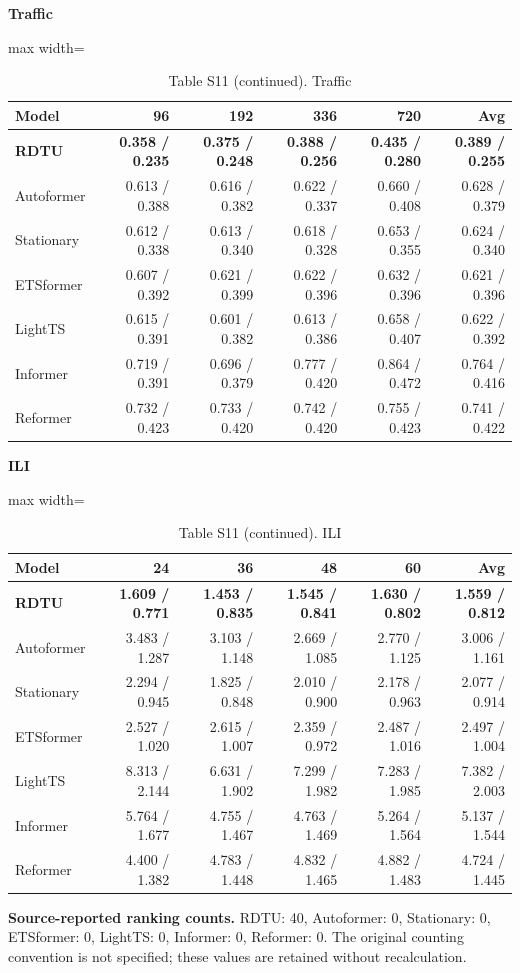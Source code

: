 \begin{table}[H]\centering\small
\caption*{Table S11 (continued). Traffic}
\textbf{Traffic}\par\smallskip
\begin{adjustbox}{max width=\linewidth}\begin{tabular}{lrrrrr}\toprule
\textbf{Model} & \textbf{96} & \textbf{192} & \textbf{336} & \textbf{720} & \textbf{Avg}\\\midrule
\rowcolor{blue!5}
\textbf{RDTU} & \textbf{0.358 / 0.235} & \textbf{0.375 / 0.248} & \textbf{0.388 / 0.256} & \textbf{0.435 / 0.280} & \textbf{0.389 / 0.255}\\
Autoformer & 0.613 / 0.388 & 0.616 / 0.382 & 0.622 / 0.337 & 0.660 / 0.408 & 0.628 / 0.379\\
Stationary & 0.612 / 0.338 & 0.613 / 0.340 & 0.618 / 0.328 & 0.653 / 0.355 & 0.624 / 0.340\\
ETSformer & 0.607 / 0.392 & 0.621 / 0.399 & 0.622 / 0.396 & 0.632 / 0.396 & 0.621 / 0.396\\
LightTS & 0.615 / 0.391 & 0.601 / 0.382 & 0.613 / 0.386 & 0.658 / 0.407 & 0.622 / 0.392\\
Informer & 0.719 / 0.391 & 0.696 / 0.379 & 0.777 / 0.420 & 0.864 / 0.472 & 0.764 / 0.416\\
Reformer & 0.732 / 0.423 & 0.733 / 0.420 & 0.742 / 0.420 & 0.755 / 0.423 & 0.741 / 0.422\\
\bottomrule\end{tabular}\end{adjustbox}\end{table}
\begin{table}[H]\centering\small
\caption*{Table S11 (continued). ILI}
\textbf{ILI}\par\smallskip
\begin{adjustbox}{max width=\linewidth}\begin{tabular}{lrrrrr}\toprule
\textbf{Model} & \textbf{24} & \textbf{36} & \textbf{48} & \textbf{60} & \textbf{Avg}\\\midrule
\rowcolor{blue!5}
\textbf{RDTU} & \textbf{1.609 / 0.771} & \textbf{1.453 / 0.835} & \textbf{1.545 / 0.841} & \textbf{1.630 / 0.802} & \textbf{1.559 / 0.812}\\
Autoformer & 3.483 / 1.287 & 3.103 / 1.148 & 2.669 / 1.085 & 2.770 / 1.125 & 3.006 / 1.161\\
Stationary & 2.294 / 0.945 & 1.825 / 0.848 & 2.010 / 0.900 & 2.178 / 0.963 & 2.077 / 0.914\\
ETSformer & 2.527 / 1.020 & 2.615 / 1.007 & 2.359 / 0.972 & 2.487 / 1.016 & 2.497 / 1.004\\
LightTS & 8.313 / 2.144 & 6.631 / 1.902 & 7.299 / 1.982 & 7.283 / 1.985 & 7.382 / 2.003\\
Informer & 5.764 / 1.677 & 4.755 / 1.467 & 4.763 / 1.469 & 5.264 / 1.564 & 5.137 / 1.544\\
Reformer & 4.400 / 1.382 & 4.783 / 1.448 & 4.832 / 1.465 & 4.882 / 1.483 & 4.724 / 1.445\\
\bottomrule\end{tabular}\end{adjustbox}\end{table}
\noindent\textbf{Source-reported ranking counts.} RDTU: 40, Autoformer: 0, Stationary: 0, ETSformer: 0, LightTS: 0, Informer: 0, Reformer: 0. The original counting convention is not specified; these values are retained without recalculation.\par
